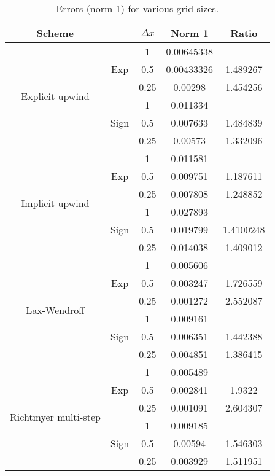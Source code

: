 	\begin{table}[]
		\centering
		\caption{Errors (norm 1) for various grid sizes.}
		\label{tab:ratiosGridConvergence}
		\begin{tabular}{|c|c|c|c|c|}
			\cline{1-1} \cline{3-5}
			\textbf{Scheme} & \textbf{} & \textbf{$\Delta x$} & \textbf{Norm 1} & \textbf{Ratio} \\ \hline \hline
			\multirow{6}{*}{Explicit upwind}
			& \multirow{3}{*}{Exp} & 1 & 0.00645338 &  \\ \cline{3-5} 
			&  & 0.5 & 0.00433326 & 1.489267\\ \cline{3-5} 
			&  & 0.25 & 0.00298 & 1.454256 \\ \cline{2-5} 
			& \multirow{3}{*}{Sign} & 1 & 0.011334 &  \\ \cline{3-5} 
			&  & 0.5 & 0.007633 & 1.484839 \\ \cline{3-5} 
			&  & 0.25 & 0.00573 & 1.332096 \\ \hline \hline
			\multirow{6}{*}{Implicit upwind}
			& \multirow{3}{*}{Exp} & 1 & 0.011581 &  \\ \cline{3-5} 
			&  & 0.5 & 0.009751 & 1.187611 \\ \cline{3-5} 
			&  & 0.25 & 0.007808 & 1.248852 \\ \cline{2-5} 
			& \multirow{3}{*}{Sign} & 1 & 0.027893 &  \\ \cline{3-5} 
			&  & 0.5 & 0.019799 & 1.4100248 \\ \cline{3-5} 
			&  & 0.25 & 0.014038 & 1.409012 \\ \hline \hline
			\multirow{6}{*}{Lax-Wendroff}
			& \multirow{3}{*}{Exp} & 1 & 0.005606 &  \\ \cline{3-5} 
			&  & 0.5 & 0.003247 & 1.726559 \\ \cline{3-5} 
			&  & 0.25 & 0.001272 & 2.552087 \\ \cline{2-5} 
			& \multirow{3}{*}{Sign} & 1 & 0.009161 &  \\ \cline{3-5} 
			&  & 0.5 & 0.006351 & 1.442388 \\ \cline{3-5} 
			&  & 0.25 & 0.004851 & 1.386415 \\ \hline \hline
			\multirow{6}{*}{Richtmyer multi-step}
			& \multirow{3}{*}{Exp} & 1 & 0.005489 &  \\ \cline{3-5} 
			&  & 0.5 & 0.002841 & 1.9322 \\ \cline{3-5} 
			&  & 0.25 & 0.001091 & 2.604307 \\ \cline{2-5} 
			& \multirow{3}{*}{Sign} & 1 & 0.009185 &  \\ \cline{3-5} 
			&  & 0.5 & 0.00594 & 1.546303 \\ \cline{3-5} 
			&  & 0.25 & 0.003929 & 1.511951 \\ \hline
		\end{tabular}
	\end{table}